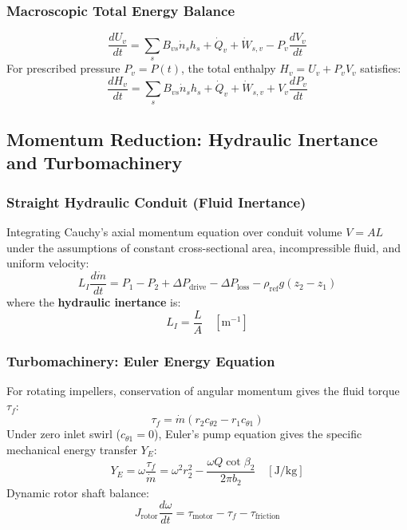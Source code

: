 \documentclass[11pt,a4paper]{article}
\begin{document}
\subsubsection{Macroscopic Total Energy Balance}
\begin{equation}
\frac{dU_v}{dt} = \sum_{s} B_{vs} \dot{n}_s h_s + \dot{Q}_v + \dot{W}_{s, v} - P_v \frac{dV_v}{dt}
\end{equation}
For prescribed pressure $P_v = P(t)$, the total enthalpy $H_v = U_v + P_v V_v$ satisfies:
\begin{equation}
\frac{dH_v}{dt} = \sum_{s} B_{vs} \dot{n}_s h_s + \dot{Q}_v + \dot{W}_{s, v} + V_v \frac{dP_v}{dt}
\end{equation}

\subsection{Momentum Reduction: Hydraulic Inertance and Turbomachinery}

\subsubsection{Straight Hydraulic Conduit (Fluid Inertance)}
Integrating Cauchy's axial momentum equation over conduit volume $V = A L$ under the assumptions of constant cross-sectional area, incompressible fluid, and uniform velocity:
\begin{equation}
L_I \frac{d\dot{m}}{dt} = P_1 - P_2 + \Delta P_{\text{drive}} - \Delta P_{\text{loss}} - \rho_{\text{ref}} g (z_2 - z_1)
\end{equation}
where the \textbf{hydraulic inertance} is:
\begin{equation}
L_I = \frac{L}{A} \quad [\text{m}^{-1}]
\end{equation}

\subsubsection{Turbomachinery: Euler Energy Equation}
For rotating impellers, conservation of angular momentum gives the fluid torque $\tau_f$:
\begin{equation}
\tau_f = \dot{m} (r_2 c_{\theta 2} - r_1 c_{\theta 1})
\end{equation}
Under zero inlet swirl ($c_{\theta 1} = 0$), Euler's pump equation gives the specific mechanical energy transfer $Y_E$:
\begin{equation}
Y_E = \omega \frac{\tau_f}{\dot{m}} = \omega^2 r_2^2 - \frac{\omega Q \cot \beta_2}{2\pi b_2} \quad [\text{J/kg}]
\end{equation}
Dynamic rotor shaft balance:
\begin{equation}
J_{\text{rotor}} \frac{d\omega}{dt} = \tau_{\text{motor}} - \tau_f - \tau_{\text{friction}}
\end{equation}
\end{document}
